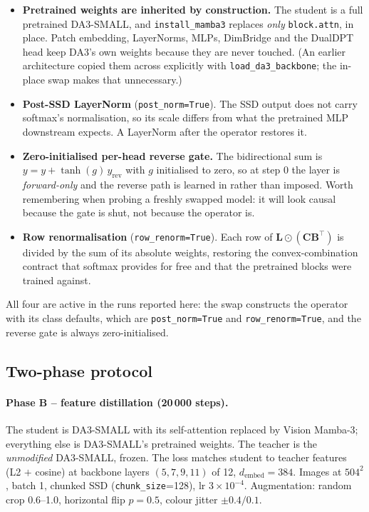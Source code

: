\documentclass[11pt,a4paper]{article}
\begin{document}
\begin{itemize}
\item \textbf{Pretrained weights are inherited by construction.} The student is a
      full pretrained DA3-SMALL, and \texttt{install\_mamba3} replaces
      \emph{only} \texttt{block.attn}, in place. Patch embedding, LayerNorms,
      MLPs, DimBridge and the DualDPT head keep DA3's own weights because they
      are never touched. (An earlier architecture copied them across explicitly
      with \texttt{load\_da3\_backbone}; the in-place swap makes that
      unnecessary.)
\item \textbf{Post-SSD LayerNorm} (\texttt{post\_norm=True}). The SSD output does
      not carry softmax's normalisation, so its scale differs from what the
      pretrained MLP downstream expects. A LayerNorm after the operator restores
      it.
\item \textbf{Zero-initialised per-head reverse gate.} The bidirectional sum is
      $y = y + \tanh(g)\,y_{\text{rev}}$ with $g$ initialised to zero, so at step
      $0$ the layer is \emph{forward-only} and the reverse path is learned in
      rather than imposed. Worth remembering when probing a freshly swapped
      model: it will look causal because the gate is shut, not because the
      operator is.
\item \textbf{Row renormalisation} (\texttt{row\_renorm=True}). Each row of
      $\bm{L}\odot(\bm{C}\bm{B}^{\top})$ is divided by the sum of its absolute
      weights, restoring the convex-combination contract that softmax provides
      for free and that the pretrained blocks were trained against.
\end{itemize}

\noindent All four are active in the runs reported here: the swap constructs the
operator with its class defaults, which are \texttt{post\_norm=True} and
\texttt{row\_renorm=True}, and the reverse gate is always zero-initialised.

\subsection{Two-phase protocol}
\label{sec:eth3d-depth-protocol}

\paragraph{Phase B -- feature distillation (20\,000 steps).}
The student is DA3-SMALL with its self-attention replaced by Vision Mamba-3;
everything else is DA3-SMALL's pretrained weights. The teacher is the
\emph{unmodified} DA3-SMALL, frozen. The loss matches student to teacher
features (L2 $+$ cosine) at backbone layers $(5,7,9,11)$ of 12,
$d_{\text{embed}}=384$. Images at $504^2$, batch 1, chunked SSD
(\texttt{chunk\_size}=128), lr $3\times10^{-4}$. Augmentation: random crop
0.6--1.0, horizontal flip $p=0.5$, colour jitter $\pm0.4/0.1$.
\end{document}
